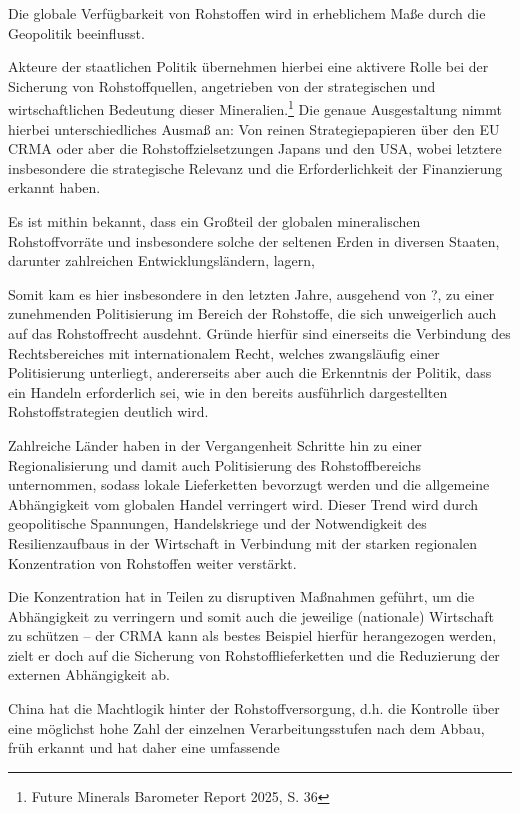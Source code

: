 \documentclass[12pt,a4paper,oneside]{book} %
\begin{document}
Die globale Verfügbarkeit von Rohstoffen wird in erheblichem Maße durch die Geopolitik beeinflusst.\autocite{bibid}

Akteure der staatlichen Politik übernehmen hierbei eine aktivere Rolle bei der Sicherung von Rohstoffquellen, angetrieben von der strategischen und wirtschaftlichen Bedeutung dieser Mineralien.\footnote{Future Minerals Barometer Report 2025, S. 36} Die genaue Ausgestaltung nimmt hierbei unterschiedliches Ausmaß an: Von reinen Strategiepapieren über den EU CRMA oder aber die Rohstoffzielsetzungen Japans und den USA, wobei letztere insbesondere die strategische Relevanz und die Erforderlichkeit der Finanzierung erkannt haben.

Es ist mithin bekannt, dass ein Großteil der globalen mineralischen Rohstoffvorräte und insbesondere solche der seltenen Erden in diversen Staaten, darunter zahlreichen Entwicklungsländern, lagern, 

Somit kam es hier insbesondere in den letzten Jahre, ausgehend von ?, zu einer zunehmenden Politisierung im Bereich der Rohstoffe, die sich unweigerlich auch auf das Rohstoffrecht ausdehnt. Gründe hierfür sind einerseits die Verbindung des Rechtsbereiches mit internationalem Recht, welches zwangsläufig einer Politisierung unterliegt, andererseits aber auch die Erkenntnis der Politik, dass ein Handeln erforderlich sei, wie in den bereits ausführlich dargestellten Rohstoffstrategien deutlich wird.

Zahlreiche Länder haben in der Vergangenheit Schritte hin zu einer Regionalisierung und damit auch Politisierung des Rohstoffbereichs unternommen, sodass lokale Lieferketten bevorzugt werden und die allgemeine Abhängigkeit vom globalen Handel verringert wird. Dieser Trend wird durch geopolitische Spannungen, Handelskriege und der Notwendigkeit des Resilienzaufbaus in der Wirtschaft in Verbindung mit der starken regionalen Konzentration von Rohstoffen weiter verstärkt.

Die Konzentration hat in Teilen zu disruptiven Maßnahmen geführt, um die Abhängigkeit zu verringern und somit auch die jeweilige (nationale) Wirtschaft zu schützen -- der CRMA kann als bestes Beispiel hierfür herangezogen werden, zielt er doch auf die Sicherung von Rohstofflieferketten und die Reduzierung der externen Abhängigkeit ab.

China hat die Machtlogik hinter der Rohstoffversorgung, d.h. die Kontrolle über eine möglichst hohe Zahl der einzelnen Verarbeitungsstufen nach dem Abbau, früh erkannt und hat daher eine umfassende 
\end{document}
